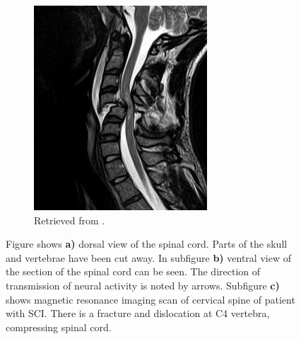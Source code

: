 \begin{figure}
{{\begin{subfigure}{.43\textwidth}
    \includegraphics[width=\textwidth]{Images/introduction/SCI.png}
    \caption{Retrieved from \citet{Korolev2012}.}
    \end{subfigure}%
  }\cr
}
\caption{Figure shows \textbf{a)} dorsal view of the spinal cord. Parts of the skull and vertebrae have been cut away. In subfigure \textbf{b)} ventral view of the section of the spinal cord can be seen. The direction of transmission of neural activity is noted by arrows. Subfigure \textbf{c)} shows magnetic resonance imaging scan of cervical spine of patient with SCI. There is a fracture and dislocation at C4 vertebra, compressing spinal cord.}
\label{fig:spinal_cord}
\end{figure}

